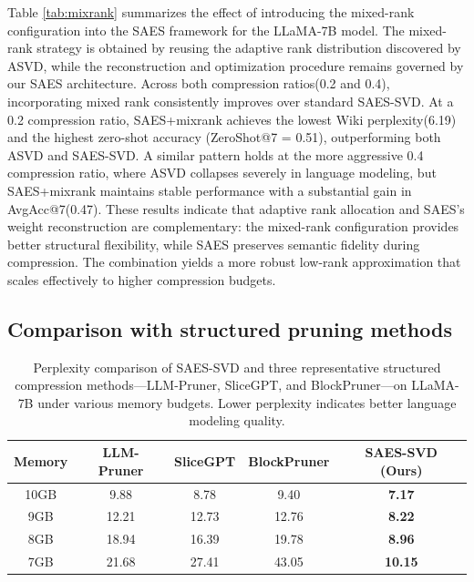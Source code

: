 Table \ref{tab:mixrank} summarizes the effect of introducing the mixed-rank configuration into the SAES framework for the LLaMA-7B model. The mixed-rank strategy is obtained by reusing the adaptive rank distribution discovered by ASVD, while the reconstruction and optimization procedure remains governed by our SAES architecture.
Across both compression ratios(0.2 and 0.4), incorporating mixed rank consistently improves over standard SAES-SVD. At a 0.2 compression ratio, SAES+mixrank achieves the lowest Wiki perplexity(6.19) and the highest zero-shot accuracy (ZeroShot@7 = 0.51), outperforming both ASVD and SAES-SVD. A similar pattern holds at the more aggressive 0.4 compression ratio, where ASVD collapses severely in language modeling, but SAES+mixrank maintains stable performance with a substantial gain in AvgAcc@7(0.47).
These results indicate that adaptive rank allocation and SAES's weight reconstruction are complementary: the mixed-rank configuration provides better structural flexibility, while SAES preserves semantic fidelity during compression. The combination yields a more robust low-rank approximation that scales effectively to higher compression budgets. 


\subsection{Comparison with structured pruning methods}

\begin{table}[t]
\centering
\caption{{Perplexity comparison of SAES-SVD and three representative structured compression methods---LLM-Pruner, SliceGPT, and BlockPruner---on LLaMA-7B under various memory budgets. Lower perplexity indicates better language modeling quality.}}
\label{tab:pruning}
\begin{tabular}{c c c c c}
\toprule
\textbf{Memory} & \textbf{LLM-Pruner} & \textbf{SliceGPT} & \textbf{BlockPruner} & \textbf{SAES-SVD (Ours)} \\
\midrule
10GB & 9.88 & 8.78 & 9.40 & \textbf{7.17} \\
9GB  & 12.21 & 12.73 & 12.76 & \textbf{8.22} \\
8GB  & 18.94 & 16.39 & 19.78 & \textbf{8.96} \\
7GB  & 21.68 & 27.41 & 43.05 & \textbf{10.15} \\
\bottomrule
\end{tabular}
\end{table}

